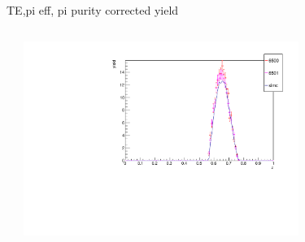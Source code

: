 \begin{frame}{TE,pi eff, pi purity corrected yield}
\begin{columns}
\begin{column}[T]{0.5\textwidth}
\end{column}
\begin{column}[T]{0.5\textwidth}
\includegraphics[width = 0.7\textwidth]{results/yield/check/yieldcheck_320_pos.pdf}
\end{column}
\end{columns}
\end{frame}
